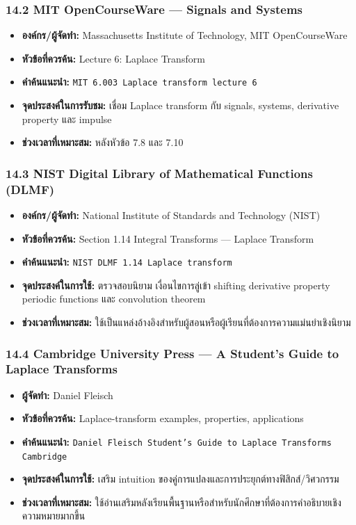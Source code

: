 \subsubsection{14.2 MIT OpenCourseWare — Signals and Systems}

\begin{itemize}
    \item \textbf{องค์กร/ผู้จัดทำ:} Massachusetts Institute of Technology, MIT OpenCourseWare
    \item \textbf{หัวข้อที่ควรค้น:} Lecture 6: Laplace Transform
    \item \textbf{คำค้นแนะนำ:} \texttt{MIT 6.003 Laplace transform lecture 6}
    \item \textbf{จุดประสงค์ในการรับชม:} เชื่อม Laplace transform กับ signals, systems, derivative property และ impulse
    \item \textbf{ช่วงเวลาที่เหมาะสม:} หลังหัวข้อ 7.8 และ 7.10
\end{itemize}

\subsubsection{14.3 NIST Digital Library of Mathematical Functions (DLMF)}

\begin{itemize}
    \item \textbf{องค์กร/ผู้จัดทำ:} National Institute of Standards and Technology (NIST)
    \item \textbf{หัวข้อที่ควรค้น:} Section 1.14 Integral Transforms — Laplace Transform
    \item \textbf{คำค้นแนะนำ:} \texttt{NIST DLMF 1.14 Laplace transform}
    \item \textbf{จุดประสงค์ในการใช้:} ตรวจสอบนิยาม เงื่อนไขการลู่เข้า shifting derivative property periodic functions และ convolution theorem
    \item \textbf{ช่วงเวลาที่เหมาะสม:} ใช้เป็นแหล่งอ้างอิงสำหรับผู้สอนหรือผู้เรียนที่ต้องการความแม่นยำเชิงนิยาม
\end{itemize}

\subsubsection{14.4 Cambridge University Press — A Student's Guide to Laplace Transforms}

\begin{itemize}
    \item \textbf{ผู้จัดทำ:} Daniel Fleisch
    \item \textbf{หัวข้อที่ควรค้น:} Laplace-transform examples, properties, applications
    \item \textbf{คำค้นแนะนำ:} \texttt{Daniel Fleisch Student's Guide to Laplace Transforms Cambridge}
    \item \textbf{จุดประสงค์ในการใช้:} เสริม intuition ของคู่การแปลงและการประยุกต์ทางฟิสิกส์/วิศวกรรม
    \item \textbf{ช่วงเวลาที่เหมาะสม:} ใช้อ่านเสริมหลังเรียนพื้นฐานหรือสำหรับนักศึกษาที่ต้องการคำอธิบายเชิงความหมายมากขึ้น
\end{itemize}

